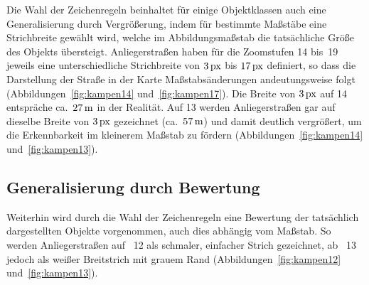 \documentclass[../main/thesis.tex]{subfiles}
\begin{document}
Die Wahl der Zeichenregeln beinhaltet für einige Objektklassen auch eine Generalisierung durch Vergrößerung, indem für bestimmte Maßstäbe eine Strichbreite gewählt wird, welche im Abbildungsmaßstab die tatsächliche Größe des Objekts übersteigt.
Anliegerstraßen haben für die Zoomstufen 14 bis~19 jeweils eine unterschiedliche Strichbreite von $\unit[3]{px}$ bis $\unit[17]{px}$ definiert, so dass die Darstellung der Straße in der Karte Maßstabsänderungen andeutungsweise folgt (Abbildungen~\ref{fig:kampen14} und~\ref{fig:kampen17}). 
Die Breite von $\unit[3]{px}$ auf  14 entspräche ca.~$\unit[27]{m}$ in der Realität. 
Auf  13 werden Anliegerstraßen gar auf dieselbe Breite von $\unit[3]{px}$ gezeichnet (ca.~$\unit[57]{m}$) und damit deutlich vergrößert, um die Erkennbarkeit im kleinerem Maßstab zu fördern (Abbildungen~\ref{fig:kampen14} und~\ref{fig:kampen13}).




\subsection{Generalisierung durch Bewertung}

Weiterhin wird durch die Wahl der Zeichenregeln eine Bewertung der tatsächlich dargestellten Objekte vorgenommen, auch dies abhängig vom Maßstab.
So werden Anliegerstraßen auf ~12 als schmaler, einfacher Strich gezeichnet, ab ~13 jedoch als weißer Breitstrich mit grauem Rand (Abbildungen~\ref{fig:kampen12} und~\ref{fig:kampen13}).


\end{document}
